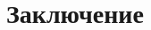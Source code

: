 \documentclass[a4paper,14pt]{article}
\begin{document}
\newpage
\section{Заключение}

\newpage 
\renewcommand{\refname}{{\normalsize \hfill Список использованных источников \hfill}} 

\begin{thebibliography}{30}

\end{thebibliography}

\newpage
\end{document}
